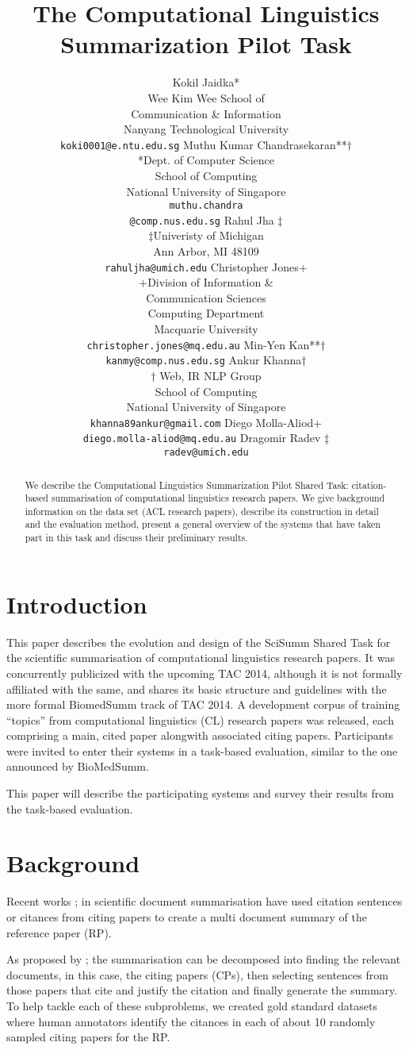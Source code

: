 \documentclass[11pt]{article}
\title{The Computational Linguistics Summarization Pilot Task}
\author{Kokil Jaidka* \\
  \small *Wee Kim Wee School of  \\
  \small Communication \& Information \\
  \small Nanyang Technological University \\
  \small {\tt koki0001@e.ntu.edu.sg} \And  
  Muthu Kumar Chandrasekaran**$\dagger$ \\
  \small **Dept. of Computer Science \\
  \small School of Computing \\
  \small National University of Singapore \\
  \small {\tt muthu.chandra}\\
  \small {\tt @comp.nus.edu.sg}  \And  
   Rahul Jha $\ddagger$ \\
  $\ddagger$\small Univeristy of Michigan \\
  \small Ann Arbor, MI 48109  \\
  \small {\tt rahuljha@umich.edu} \AND  
  Christopher Jones+ \\
  \small +Division of Information \& \\
  \small Communication Sciences \\
  \small Computing Department\\
  \small Macquarie University \\ 
  \small{\tt christopher.jones@mq.edu.au} \And
  Min-Yen Kan**$\dagger$ \\
  \small {\tt kanmy@comp.nus.edu.sg} \And  
  Ankur Khanna$\dagger$ \\
  \small $\dagger$ Web, IR \/ NLP Group \\
  \small School of Computing \\
  \small National University of Singapore \\
  \small {\tt khanna89ankur@gmail.com} \AND  
  Diego Molla-Aliod+ \\
  \small{\tt diego.molla-aliod@mq.edu.au} \And
  Dragomir Radev $\ddagger$ \\
  \small {\tt radev@umich.edu} \And  
 }
\date{}
\begin{document}
\maketitle
\begin{abstract}
We describe the Computational Linguistics Summarization Pilot 
Shared Task: citation-based summarisation of computational 
linguistics research papers. We give background information on 
the data set (ACL research papers), describe its construction 
in detail and the evaluation method, present a general overview 
of the systems that have taken part in this task and discuss 
their preliminary results.
\end{abstract}

\section{Introduction}
This paper describes the evolution and design of the SciSumm Shared Task for 
the scientific summarisation of computational linguistics research papers. 
It was concurrently publicized with the upcoming TAC 2014, although it is not 
formally affiliated with the same, and shares its basic structure and 
guidelines with the more formal BiomedSumm track of TAC 2014. A development 
corpus of training ``topics'' from computational linguistics (CL) research 
papers was released, each comprising a main, cited paper alongwith  associated 
citing papers. Participants were invited to enter their systems  in a 
task-based evaluation, similar to the one announced by BioMedSumm.

This paper will describe the participating systems and survey their results 
from the task-based evaluation.

\section{Background}
Recent works \cite{mohammad2009};\cite{abu2011} in scientific document 
summarisation have used citation sentences or citances from citing  papers 
to create a multi document summary of the reference paper (RP). 

As proposed by \cite{vu2010}; \cite{hoang2010} the summarisation can be 
decomposed into finding the relevant documents, in this case, the citing 
papers (CPs), then selecting sentences from those papers that cite and 
justify the citation and finally generate the summary. To help tackle each 
of these subproblems, we created gold standard datasets where human annotators 
identify the citances in each of about 10 randomly sampled citing papers for 
the RP.
\end{document}
